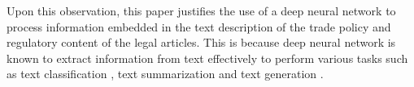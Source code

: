 

Upon this observation, this paper justifies the use of a deep neural network to process information embedded in the text description of the trade policy and regulatory content of the legal articles. This is because deep neural network is known to
extract information from text effectively to perform various tasks such as text classification \citep{minaee2020deep}, text summarization \citep{textsum} and text generation \citep{guo2017long}.
 
 
 

